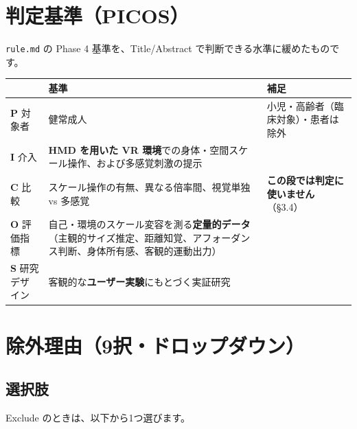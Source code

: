 \documentclass[a4paper]{ltjsarticle}
\begin{document}
\section{判定基準（PICOS）}

\texttt{rule.md} の Phase 4 基準を、Title/Abstract で判断できる水準に緩めたものです。

\begin{center}
\begin{tabularx}{\linewidth}{L{6em} X L{10em}}
\toprule
 & 基準 & 補足 \\
\midrule
\textbf{P} 対象者 & 健常成人 & 小児・高齢者（臨床対象）・患者は除外 \\
\addlinespace
\textbf{I} 介入 & \textbf{HMD を用いた VR 環境}での身体・空間スケール操作、および多感覚刺激の提示 & \\
\addlinespace
\textbf{C} 比較 & スケール操作の有無、異なる倍率間、視覚単独 vs 多感覚 & \textbf{この段では判定に使いません}（§3.4） \\
\addlinespace
\textbf{O} 評価指標 & 自己・環境のスケール変容を測る\textbf{定量的データ}（主観的サイズ推定、距離知覚、アフォーダンス判断、身体所有感、客観的運動出力） & \\
\addlinespace
\textbf{S} 研究デザイン & 客観的な\textbf{ユーザー実験}にもとづく実証研究 & \\
\bottomrule
\end{tabularx}
\end{center}

\section{除外理由（9択・ドロップダウン）}

\subsection{選択肢}

Exclude のときは、以下から1つ選びます。
\end{document}
